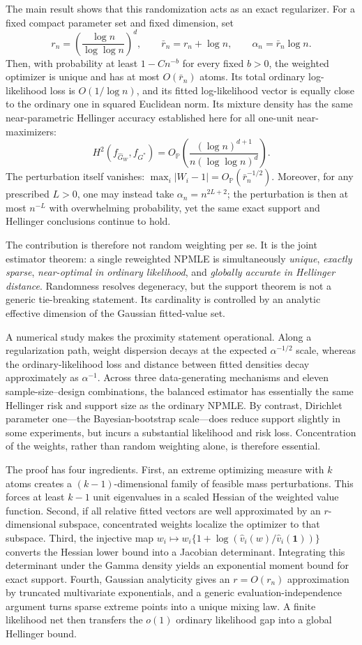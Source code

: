 \documentclass[11pt]{article}
\theoremstyle{definition}
\theoremstyle{remark}
\newcommand{\PP}{\mathbb P}
\newcommand{\one}{\bm 1}
\newcommand{\abs}[1]{\lvert #1\rvert}
\newcommand{\vhat}{\widehat v}
\newcommand{\Ghat}{\widehat G}
\begin{document}
The main result shows that this randomization acts as an exact regularizer.
For a fixed compact parameter set and fixed dimension, set
\[
 r_n=\left(\frac{\log n}{\log\log n}\right)^d,
 \qquad \bar r_n=r_n+\log n,
 \qquad \alpha_n=\bar r_n\log n.
\]
Then, with probability at least $1-Cn^{-b}$ for every fixed $b>0$, the
weighted optimizer is unique and has at most $O(\bar r_n)$ atoms.  Its total
ordinary log-likelihood loss is $O(1/\log n)$, and its fitted log-likelihood
vector is equally close to the ordinary one in squared Euclidean norm.  Its
mixture density has the same near-parametric Hellinger accuracy established
here for all one-unit near-maximizers:
\[
 H^2(f_{\Ghat_W},f_{G^*})
 =O_{\PP}\!\left(\frac{(\log n)^{d+1}}
 {n(\log\log n)^d}\right).
\]
The perturbation itself vanishes:
$\max_i\abs{W_i-1}=O_{\PP}(\bar r_n^{-1/2})$.  Moreover, for any prescribed
$L>0$, one may instead take $\alpha_n=n^{2L+2}$; the perturbation is then at
most $n^{-L}$ with overwhelming probability, yet the same exact support and
Hellinger conclusions continue to hold.

The contribution is therefore not random weighting per se.  It is the joint
estimator theorem: a single reweighted NPMLE is simultaneously
\emph{unique}, \emph{exactly sparse}, \emph{near-optimal in ordinary
likelihood}, and \emph{globally accurate in Hellinger distance}.  Randomness
resolves degeneracy, but the support theorem is not a generic tie-breaking
statement.  Its cardinality is controlled by an analytic effective dimension
of the Gaussian fitted-value set.

A numerical study makes the proximity statement operational.  Along a
regularization path, weight dispersion decays at the expected
$\alpha^{-1/2}$ scale, whereas the ordinary-likelihood loss and distance
between fitted densities decay approximately as $\alpha^{-1}$.  Across
three data-generating mechanisms and eleven sample-size--design combinations,
the balanced estimator has essentially the same Hellinger risk and support
size as the ordinary NPMLE.  By contrast, Dirichlet parameter one---the
Bayesian-bootstrap scale---does reduce support slightly in some experiments,
but incurs a substantial likelihood and risk loss.  Concentration of the
weights, rather than random weighting alone, is therefore essential.

The proof has four ingredients.  First, an extreme optimizing measure with
$k$ atoms creates a $(k-1)$-dimensional family of feasible mass perturbations.
This forces at least $k-1$ unit eigenvalues in a scaled Hessian of the weighted
value function.  Second, if all relative fitted vectors are well approximated
by an $r$-dimensional subspace, concentrated weights localize the optimizer to
that subspace.  Third, the injective map
$w_i\mapsto w_i\{1+\log(\vhat_i(w)/\vhat_i(\one))\}$ converts the Hessian
lower bound into a Jacobian determinant.  Integrating this determinant under
the Gamma density yields an exponential moment bound for exact support.
Fourth, Gaussian analyticity gives an $r=O(r_n)$ approximation by truncated
multivariate exponentials, and a generic evaluation-independence argument
turns sparse extreme points into a unique mixing law.  A finite likelihood
net then transfers the $o(1)$ ordinary likelihood gap into a global Hellinger
bound.
\end{document}
